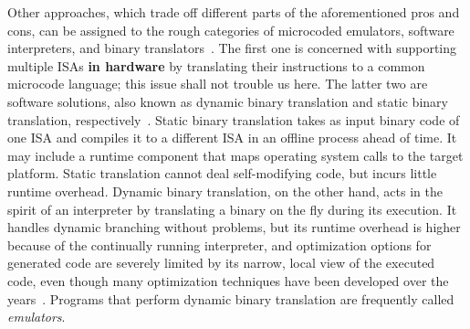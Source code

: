 Other approaches, which trade off different parts of the aforementioned pros and cons, can be assigned to the rough
categories of microcoded emulators, software interpreters, and binary translators~\cite{sites1993binary}. The first one
is concerned with supporting multiple \ac{ISA}s \textbf{in hardware} by translating their instructions to a common
microcode language; this issue shall not trouble us here. The latter two are software solutions, also known as dynamic
binary translation and static binary translation, respectively~\cite{cifuentes1996staticdynamic, Rocha2022Lasagne}.
Static binary translation takes as input binary code of one \ac{ISA} and compiles it to a different \ac{ISA} in an
offline process ahead of time. It may include a runtime component that maps operating system calls to the target
platform. Static translation cannot deal self-modifying code, but incurs little runtime overhead. Dynamic binary
translation, on the other hand, acts in the spirit of an interpreter by translating a binary on the fly during its
execution. It handles dynamic branching without problems, but its runtime overhead is higher because of the continually
running interpreter, and optimization options for generated code are severely limited by its narrow, local view of the
executed code, even though many optimization techniques have been developed over the
years~\cite{Guan+2010DbtOptimizations, Sun+2023DbtBranchPred, Hawkins2015OptimizingDbt, Kedia+2013DbtKernel}. Programs
that perform dynamic binary translation are frequently called \textit{emulators}.
